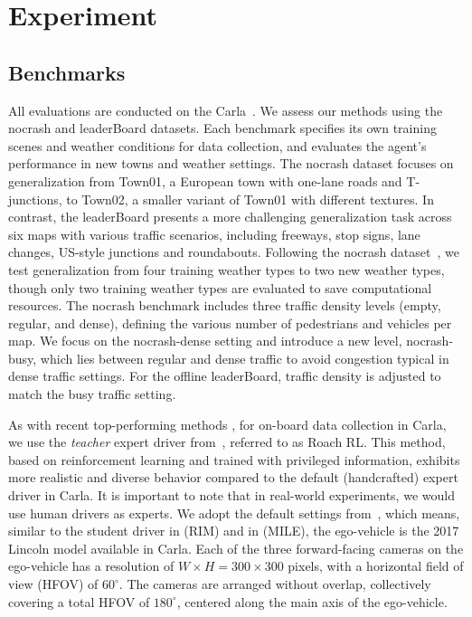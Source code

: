 \section{Experiment}
%	

\subsection{Benchmarks} \label{sec:Dataset}

\hspace{1pc}All evaluations are conducted on the Carla~\cite{Dosovitskiy:2017}. 
We assess our methods using the nocrash \cite{codevilla2019exploring} and leaderBoard datasets. 
Each benchmark specifies its own training scenes and weather conditions for data collection, and evaluates the agent's performance in new towns and weather settings. 
The nocrash dataset focuses on generalization from Town01, a European town with one-lane roads and T-junctions, to Town02, a smaller variant of Town01 with different textures. 
In contrast, the leaderBoard presents a more challenging generalization task across six maps with various traffic scenarios, including freeways, stop signs, lane changes, US-style junctions and roundabouts. 
Following the nocrash dataset~\cite{codevilla2019exploring}, we test generalization from four training weather types to two new weather types, though only two training weather types are evaluated to save computational resources. 
The nocrash benchmark includes three traffic density levels (empty, regular, and dense), defining the various number of pedestrians and vehicles per map. 
We focus on the nocrash-dense setting and introduce a new level, nocrash-busy, which lies between regular and dense traffic to avoid congestion typical in dense traffic settings. 
For the offline leaderBoard, traffic density is adjusted to match the busy traffic setting. 


As with recent top-performing methods \cite{Hu:2022}, for on-board data collection in Carla, we use the \emph{teacher} expert driver from~\cite{Zhang:2021}, referred to as Roach RL.
This method, based on reinforcement learning and trained with privileged information, exhibits more realistic and diverse behavior compared to the default (handcrafted) expert driver in Carla. 
It is important to note that in real-world experiments, we would use human drivers as experts.
We adopt the default settings from~\cite{Zhang:2021}, which means, similar to the student driver in \cite{Zhang:2021} (RIM) and in \cite{Hu:2022} (MILE), the ego-vehicle is the 2017 Lincoln model available in Carla.
Each of the three forward-facing cameras on the ego-vehicle has a resolution of $W\times H=300\times300$ pixels, with a horizontal field of view (HFOV) of $60^{\circ}$.
The cameras are arranged without overlap, collectively covering a total HFOV of $180^{\circ}$, centered along the main axis of the ego-vehicle.


